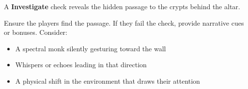 \documentclass[nodeprecatedcode,bg=print]{dndbook}
\begin{document}
\begin{paracol}{2}
    A  \textbf{Investigate} check reveals the hidden passage to the crypts behind the altar.

    \begin{GmTips}
        Ensure the players find the passage. If they fail the check, provide narrative cues or bonuses. Consider:
        \begin{itemize}
            \item A spectral monk silently gesturing toward the wall
            \item Whispers or echoes leading in that direction
            \item A physical shift in the environment that draws their attention
        \end{itemize}
    \end{GmTips}

\end{paracol}

\newpage
\end{document}
